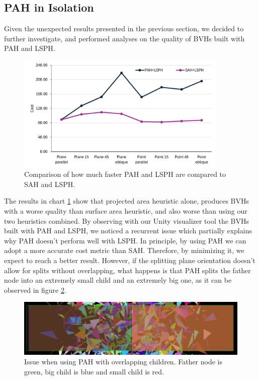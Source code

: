 \documentclass{PoliMi_MasterThesis}
\begin{document}
\subsection{PAH in Isolation} \label{ssec:pah_isolation}
Given the unexpected results presented in the previous section, we decided to further investigate, and performed analyses on the quality of BVHs built with PAH and LSPH.

\begin{figure}[H] 
	\centering
	\includegraphics[width=0.9\textwidth]{Images/pah_isolation.png}
	\caption{Comparison of how much faster PAH and LSPH are compared to SAH and LSPH.}
	\label{fig:pah_isolation}
\end{figure}

The results in chart \ref{fig:pah_isolation} show that projected area heuristic alone, produces BVHs with a worse quality than surface area heuristic, and also worse than using our two heuristics combined. By observing with our Unity visualizer tool the BVHs built with PAH and LSPH, we noticed a recurrent issue which partially explains why PAH doesn't perform well with LSPH. In principle, by using PAH we can adopt a more accurate cost metric than SAH. Therefore, by minimizing it, we expect to reach a better result. However, if the splitting plane orientation doesn't allow for splits without overlapping, what happens is that PAH splits the father node into an extremely small child and an extremely big one, as it can be observed in figure \ref{fig:pah_overlapping_children_figure}.

\begin{figure}[H] 
	\centering
	\includegraphics[width=\textwidth*\real{0.9}]{Images/overlapping_children.png}
	\caption{Issue when using PAH with overlapping children. Father node is green, big child is blue and small child is red.}
	\label{fig:pah_overlapping_children_figure}
\end{figure} 
\end{document}
